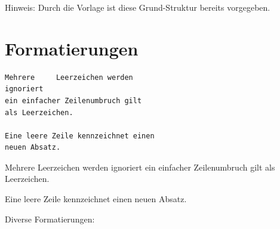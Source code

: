 Hinweis:
Durch die Vorlage ist diese Grund-Struktur bereits vorgegeben.

\section{Formatierungen}

\begin{minipage}[t]{0.6\linewidth}
\begin{Verbatim}[frame=single]
Mehrere     Leerzeichen werden 
ignoriert
ein einfacher Zeilenumbruch gilt 
als Leerzeichen.

Eine leere Zeile kennzeichnet einen 
neuen Absatz.
\end{Verbatim}
\end{minipage}
\begin{minipage}[t]{0.4\linewidth}
Mehrere     Leerzeichen werden ignoriert
ein einfacher Zeilenumbruch 
gilt als Leerzeichen.

Eine leere Zeile kennzeichnet 
einen neuen Absatz.
\end{minipage}

\vspace{1em}\noindent
Diverse Formatierungen:

